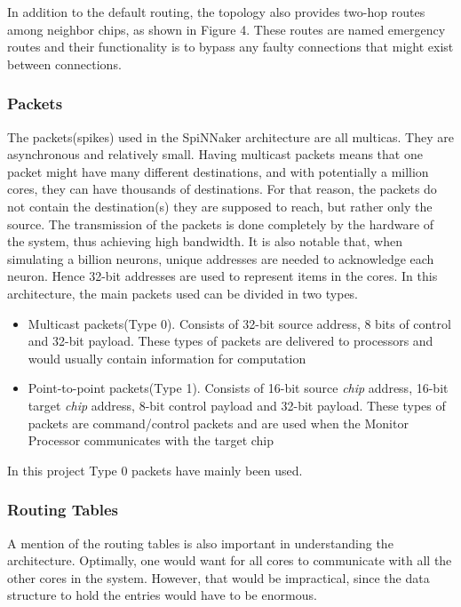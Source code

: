 \documentclass[12pt,a4paper]{article}
\begin{document}
In addition to the default routing, the topology also provides two-hop routes among neighbor chips, as shown in Figure 4. These routes are named emergency routes and their functionality is to bypass any faulty connections that might exist between connections\cite{navaridas2009understanding}\cite{plana2007gals}.

\subsubsection{Packets}
The packets(spikes) used in the SpiNNaker architecture are all multicas. They are asynchronous and relatively small. Having multicast packets means that one packet might have many different destinations, and with potentially a million cores, they can have thousands of destinations. For that reason, the packets do not contain the destination(s) they are supposed to reach, but rather only the source. The transmission of the packets is done completely by the hardware of the system, thus achieving high bandwidth\cite{spinnweb}\cite{navaridas2009understanding}. It is also notable that, when simulating a billion neurons, unique addresses are needed to acknowledge each neuron. Hence 32-bit addresses are used to represent items in the cores. In this architecture, the main packets used can be divided in two types.
\begin{itemize}
\item Multicast packets(Type 0). Consists of 32-bit source address, 8 bits of control and 32-bit payload. These types of packets are delivered to processors and would usually contain information for computation
\item Point-to-point packets(Type 1). Consists of 16-bit source \emph{chip} address, 16-bit target \emph{chip} address, 8-bit control payload and 32-bit payload. These types of packets are command/control packets and are used when the Monitor Processor communicates with the target chip\cite{docfile}
\end{itemize}

In this project Type 0 packets have mainly been used.
\subsubsection{Routing Tables}
A mention of the routing tables is also important in understanding the architecture. Optimally, one would want for all cores to communicate with all the other cores in the system. However, that would be impractical, since the data structure to hold the entries would have to be enormous.
\end{document}
